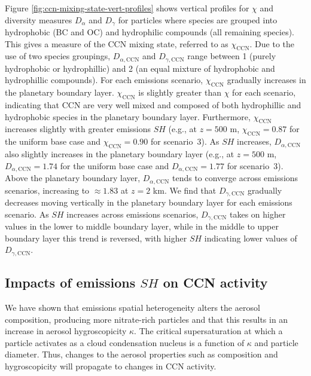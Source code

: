 Figure \ref{fig:ccn-mixing-state-vert-profiles} shows vertical profiles for $\chi$ and diversity measures $D_{\alpha}$ and $D_{\gamma}$ for particles where species are grouped into hydrophobic (BC and OC) and hydrophilic compounds (all remaining species). This gives a measure of the CCN mixing state, referred to as $\chi_{\text{CCN}}$. Due to the use of two species groupings, $D_{\alpha,\text{CCN}}$ and $D_{\gamma,\text{CCN}}$ range between 1 (purely hydrophobic or hydrophillic) and 2 (an equal mixture of hydrophobic and hydrophillic compounds). For each emissions scenario, $\chi_{\text{CCN}}$ gradually increases in the planetary boundary layer. $\chi_{\text{CCN}}$ is slightly greater than $\chi$ for each scenario, indicating that CCN are very well mixed and composed of both hydrophillic and hydrophobic species in the planetary boundary layer. Furthermore, $\chi_{\text{CCN}}$ increases slightly with greater emissions $SH$ (e.g., at $z=500$ m, $\chi_{\text{CCN}} = 0.87$ for the uniform base case and $\chi_{\text{CCN}} = 0.90$ for scenario~3). As $SH$ increases, $D_{\alpha,\text{CCN}}$ also slightly increases in the planetary boundary layer (e.g., at $z=500$ m, $D_{\alpha,\text{CCN}} = 1.74$ for the uniform base case and $D_{\alpha,\text{CCN}} = 1.77$ for scenario~3). Above the planetary boundary layer, $D_{\alpha,\text{CCN}}$ tends to converge across emissions scenarios, increasing to $\approx1.83$ at $z=2$ km. We find that $D_{\gamma,\text{CCN}}$ gradually decreases moving vertically in the planetary boundary layer for each emissions scenario. As $SH$ increases across emissions scenarios, $D_{\gamma,\text{CCN}}$ takes on higher values in the lower to middle boundary layer, while in the middle to upper boundary layer this trend is reversed, with higher $SH$ indicating lower values of $D_{\gamma,\text{CCN}}$. 

\subsection{Impacts of emissions $SH$ on CCN activity}

We have shown that emissions spatial heterogeneity alters the aerosol composition, producing more nitrate-rich particles and that this results in an increase in aerosol hygroscopicity $\kappa$. The critical supersaturation at which a particle activates as a cloud condensation nucleus is a function of $\kappa$ and particle diameter. Thus, changes to the aerosol properties such as composition and hygroscopicity will propagate to changes in CCN activity. 

